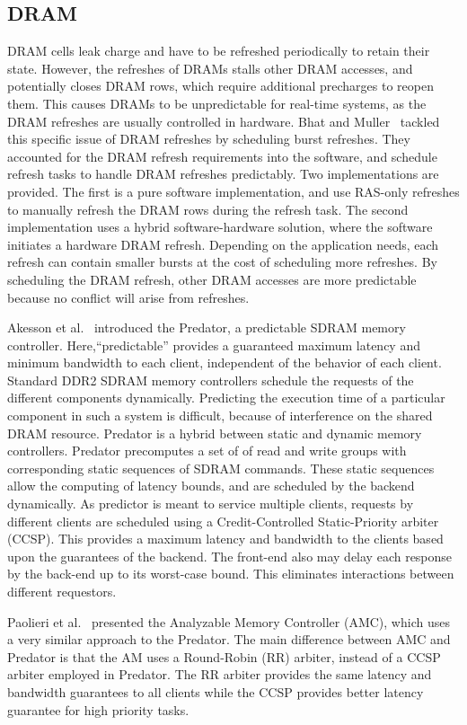\subsection{DRAM}
DRAM cells leak charge and have to be refreshed periodically to retain their state.
However, the refreshes of DRAMs stalls other DRAM accesses, and potentially closes DRAM rows, which require additional precharges to reopen them.
This causes DRAMs to be unpredictable for real-time systems, as the DRAM refreshes are usually controlled in hardware. 
Bhat and Muller~\cite{Bhat2010PredictableDRAM} tackled this specific issue of DRAM refreshes by scheduling burst refreshes.
They accounted for the DRAM refresh requirements into the software, and schedule refresh tasks to handle DRAM refreshes predictably. 
Two implementations are provided. 
The first is a pure software implementation, and use RAS-only refreshes to manually refresh the DRAM rows during the refresh task. 
The second implementation uses a hybrid software-hardware solution, where the software initiates a hardware DRAM refresh. 
Depending on the application needs, each refresh can contain smaller bursts at the cost of scheduling more refreshes. 
By scheduling the DRAM refresh, other DRAM accesses are more predictable because no conflict will arise from refreshes.  

Akesson et al.~\cite{Akesson2007CODES,Akesson2009DSD,Akesson2010} introduced the Predator, a predictable SDRAM memory controller. 
Here,``predictable'' provides a guaranteed maximum latency and minimum bandwidth to each client, independent of the behavior of each client. 
Standard DDR2 SDRAM memory controllers schedule the requests of the different components dynamically. 
Predicting the execution time of a particular component in such a system is difficult, because of interference on the shared DRAM resource. 
Predator is a hybrid between static and dynamic memory controllers.
Predator precomputes a set of of read and write groups with corresponding static sequences of SDRAM commands.
These static sequences allow the computing of latency bounds, and are scheduled by the backend dynamically. 
As predictor is meant to service multiple clients, requests by different clients are scheduled using a Credit-Controlled Static-Priority arbiter (CCSP). 
This provides a maximum latency and bandwidth to the clients based upon the guarantees of the backend. 
The front-end also may delay each response by the back-end up to its worst-case bound.
This eliminates interactions between different requestors.

Paolieri et al.~\cite{Paolieri2009ESL} presented the Analyzable Memory Controller (AMC), which uses a very similar approach to the Predator. 
The main difference between AMC and Predator is that the AM uses a Round-Robin (RR) arbiter, instead of a CCSP arbiter employed in Predator. 
The RR arbiter provides the same latency and bandwidth guarantees to all clients while the CCSP provides better latency guarantee for high priority tasks. 
